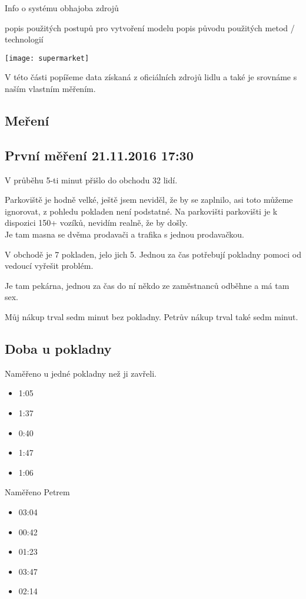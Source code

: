\documentclass[12pt,a4paper,titlepage]{article}
\begin{document}
Info o systému
obhajoba zdrojů

popis použitých postupů pro vytvoření modelu
popis původu použitých metod / technologií


\texttt{[image: supermarket]}

V této části popíšeme data získaná z oficiálních zdrojů lidlu a také je srovnáme s naším vlastním měřením.
\subsection{Meření}
\subsection{První měření 21.11.2016 17:30}
V průběhu 5-ti minut přišlo do obchodu 32 lidí.

Parkoviště je hodně velké, ještě jsem neviděl, že by se zaplnilo, asi toto můžeme ignorovat, z pohledu pokladen není podstatné.
Na parkovišti parkovišti je k dispozici 150+ vozíků, nevidím realně, že by došly.
\\
Je tam masna se dvěma prodavači a trafika s jednou prodavačkou.

V obchodě je 7 pokladen, jelo jich 5. Jednou za čas potřebují pokladny pomoci od vedoucí vyřešit problém.

Je tam pekárna, jednou za čas do ní někdo ze zaměstnanců odběhne a má tam sex.

Můj nákup trval sedm minut bez pokladny. Petrův nákup trval také sedm minut.

\subsection{Doba u pokladny}
Naměřeno u jedné pokladny než ji zavřeli.
\begin{itemize}
\item 1:05
\item 1:37
\item 0:40
\item 1:47
\item 1:06
\end{itemize}
Naměřeno Petrem
\begin{itemize}
\item 03:04
\item 00:42
\item 01:23
\item 03:47
\item 02:14
\end{itemize}
\end{document}
